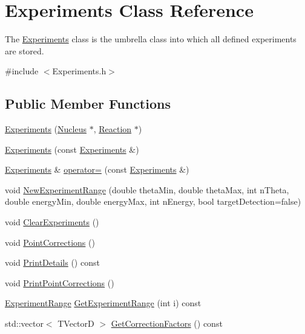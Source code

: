 \hypertarget{classExperiments}{\section{Experiments Class Reference}
\label{classExperiments}
}


The \hyperlink{classExperiments}{Experiments} class is the umbrella class into which all defined experiments are stored.  




{\ttfamily \#include $<$Experiments.\-h$>$}

\subsection*{Public Member Functions}
\begin{DoxyCompactItemize}
\item 
\hyperlink{classExperiments_a5eb52e04ded64f6c80f6c149d7b0ef50}{Experiments} (\hyperlink{classNucleus}{Nucleus} $\ast$, \hyperlink{classReaction}{Reaction} $\ast$)
\item 
\hyperlink{classExperiments_aa443f070178209bb45171fafc4aa1823}{Experiments} (const \hyperlink{classExperiments}{Experiments} \&)
\item 
\hyperlink{classExperiments}{Experiments} \& \hyperlink{classExperiments_afee4f319e5380461a1894759c9968b60}{operator=} (const \hyperlink{classExperiments}{Experiments} \&)
\item 
void \hyperlink{classExperiments_a4fd0834a194d323b6c75dea8c9645884}{New\-Experiment\-Range} (double theta\-Min, double theta\-Max, int n\-Theta, double energy\-Min, double energy\-Max, int n\-Energy, bool target\-Detection=false)
\item 
void \hyperlink{classExperiments_a17d47b581e1f6247799b54c2ef1c3652}{Clear\-Experiments} ()
\item 
void \hyperlink{classExperiments_afdfa4aa08db9ec85ca899439bdcd813a}{Point\-Corrections} ()
\item 
void \hyperlink{classExperiments_ae668ff4f1bf3a6d6ae04d0e1a05aecf2}{Print\-Details} () const 
\item 
void \hyperlink{classExperiments_a3f5c399a9ef5a852fc7045669ca05f74}{Print\-Point\-Corrections} ()
\item 
\hyperlink{classExperimentRange}{Experiment\-Range} \hyperlink{classExperiments_ab853c2acdd99546b962371f2d55cf2d2}{Get\-Experiment\-Range} (int i) const 
\item 
std\-::vector$<$ T\-Vector\-D $>$ \hyperlink{classExperiments_aeff55245693c52c828c4f193174a4095}{Get\-Correction\-Factors} () const 

\end{DoxyCompactItemize}

